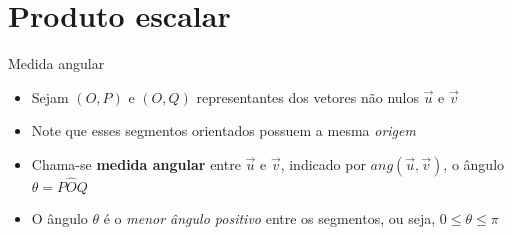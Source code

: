 \section{Produto escalar}

\begin{frame}{Medida angular}
    \begin{itemize}
        \item Sejam \((O,P)\) e \((O,Q)\) representantes dos vetores não nulos \(\vec{u}\) e \(\vec{v}\)
        \item Note que esses segmentos orientados possuem a mesma \textit{origem}
        \item Chama-se \textbf{medida angular} entre \(\vec{u}\) e \(\vec{v}\), indicado por \(ang(\vec{u},\vec{v})\), o ângulo \(\theta=P\hat{O}Q\)
        \item O ângulo \(\theta\) é o \textit{menor ângulo positivo} entre os segmentos, ou seja, \( 0 \leq \theta \leq \pi\)
    \end{itemize}

    \begin{center}
    \end{center}

\end{frame}

